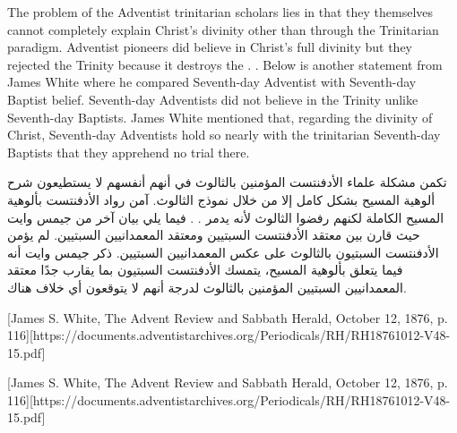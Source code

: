 The problem of the Adventist trinitarian scholars lies in that they themselves cannot completely explain Christ’s divinity other than through the Trinitarian paradigm. Adventist pioneers did believe in Christ’s full divinity but they rejected the Trinity because it destroys the . . Below is another statement from James White where he compared Seventh-day Adventist with Seventh-day Baptist belief. Seventh-day Adventists did not believe in the Trinity unlike Seventh-day Baptists. James White mentioned that, regarding the divinity of Christ, Seventh-day Adventists hold so nearly with the trinitarian Seventh-day Baptists that they apprehend no trial there.


تكمن مشكلة علماء الأدفنتست المؤمنين بالثالوث في أنهم أنفسهم لا يستطيعون شرح ألوهية المسيح بشكل كامل إلا من خلال نموذج الثالوث. آمن رواد الأدفنتست بألوهية المسيح الكاملة لكنهم رفضوا الثالوث لأنه يدمر . . فيما يلي بيان آخر من جيمس وايت حيث قارن بين معتقد الأدفنتست السبتيين ومعتقد المعمدانيين السبتيين. لم يؤمن الأدفنتست السبتيون بالثالوث على عكس المعمدانيين السبتيين. ذكر جيمس وايت أنه فيما يتعلق بألوهية المسيح، يتمسك الأدفنتست السبتيون بما يقارب جدًا معتقد المعمدانيين السبتيين المؤمنين بالثالوث لدرجة أنهم لا يتوقعون أي خلاف هناك.


[James S. White, The Advent Review and Sabbath Herald, October 12, 1876, p. 116][https://documents.adventistarchives.org/Periodicals/RH/RH18761012-V48-15.pdf]


[James S. White, The Advent Review and Sabbath Herald, October 12, 1876, p. 116][https://documents.adventistarchives.org/Periodicals/RH/RH18761012-V48-15.pdf]


